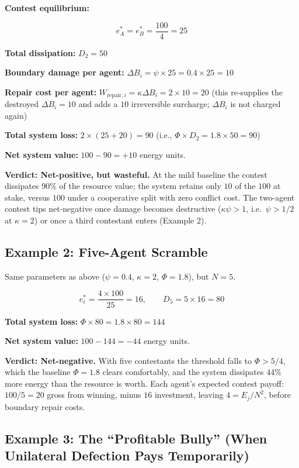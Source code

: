 \documentclass[11pt]{article}
\theoremstyle{plain}
\theoremstyle{definition}
\theoremstyle{remark}
\let\origsubsection\subsection
\renewcommand{\subsection}{\needspace{7\baselineskip}\origsubsection}
\begin{document}
\textbf{Contest equilibrium:}

\[e_A^* = e_B^* = \frac{100}{4} = 25\]

\textbf{Total dissipation:} \(D_2 = 50\)

\textbf{Boundary damage per agent:}
\(\Delta B_i = \psi \times 25 = 0.4 \times 25 = 10\)

\textbf{Repair cost per agent:}
\(W_{\text{repair},i} = \kappa \Delta B_i = 2 \times 10 = 20\) (this
re-supplies the destroyed \(\Delta B_i = 10\) and adds a \(10\)
irreversible surcharge; \(\Delta B_i\) is not charged again)

\textbf{Total system loss:} \(2 \times (25 + 20) = 90\) (i.e.,
\(\Phi \times D_2 = 1.8 \times 50 = 90\))

\textbf{Net system value:} \(100 - 90 = +10\) energy units.

\textbf{Verdict: Net-positive, but wasteful.} At the mild baseline the
contest dissipates 90\% of the resource value; the system retains only
\(10\) of the \(100\) at stake, versus \(100\) under a cooperative split
with zero conflict cost. The two-agent contest tips net-negative once
damage becomes destructive (\(\kappa\psi > 1\), i.e.~\(\psi > 1/2\) at
\(\kappa = 2\)) or once a third contestant enters (Example 2).

\subsection{Example 2: Five-Agent
Scramble}\label{example-2-five-agent-scramble}

Same parameters as above (\(\psi = 0.4\), \(\kappa = 2\),
\(\Phi = 1.8\)), but \(N = 5\).

\[e_i^* = \frac{4 \times 100}{25} = 16, \qquad D_5 = 5 \times 16 = 80\]

\textbf{Total system loss:} \(\Phi \times 80 = 1.8 \times 80 = 144\)

\textbf{Net system value:} \(100 - 144 = -44\) energy units.

\textbf{Verdict: Net-negative.} With five contestants the threshold
falls to \(\Phi > 5/4\), which the baseline \(\Phi = 1.8\) clears
comfortably, and the system dissipates 44\% more energy than the
resource is worth. Each agent's expected contest payoff: \(100/5 = 20\)
gross from winning, minus \(16\) investment, leaving \(4 = E_j/N^2\),
before boundary repair costs.

\subsection{Example 3: The ``Profitable Bully'' (When Unilateral
Defection Pays
Temporarily)}\label{example-3-the-profitable-bully-when-unilateral-defection-pays-temporarily}
\end{document}
